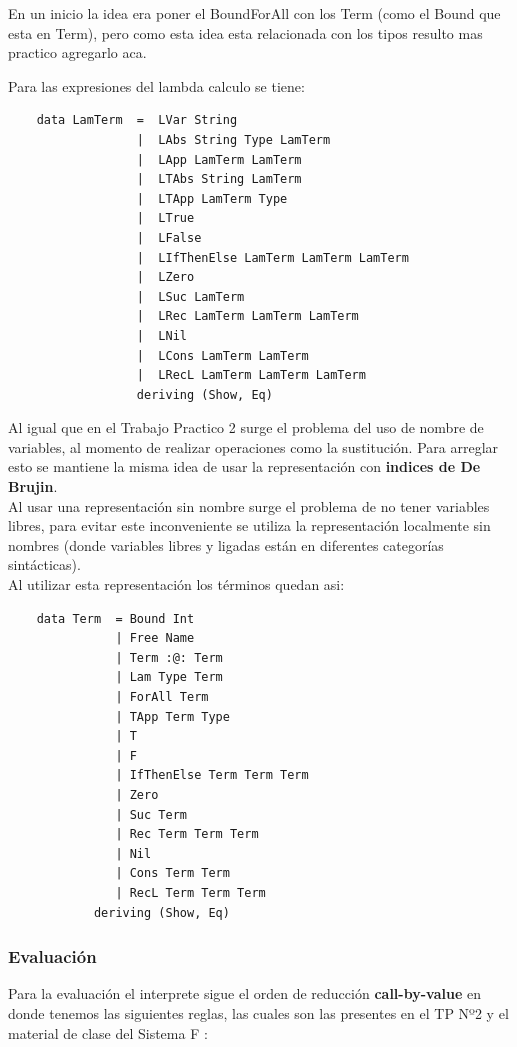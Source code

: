 \documentclass[12pt, titlepage, a4paper]{article}
\begin{document}
En un inicio la idea era poner el BoundForAll con los Term (como el Bound que esta en Term), pero como esta idea esta relacionada con 
los tipos resulto mas practico agregarlo aca.

\noindent Para las expresiones del lambda calculo se tiene:
\begin{verbatim}
    data LamTerm  =  LVar String
                  |  LAbs String Type LamTerm
                  |  LApp LamTerm LamTerm
                  |  LTAbs String LamTerm
                  |  LTApp LamTerm Type
                  |  LTrue 
                  |  LFalse
                  |  LIfThenElse LamTerm LamTerm LamTerm
                  |  LZero
                  |  LSuc LamTerm
                  |  LRec LamTerm LamTerm LamTerm
                  |  LNil
                  |  LCons LamTerm LamTerm
                  |  LRecL LamTerm LamTerm LamTerm
                  deriving (Show, Eq)
\end{verbatim}

Al igual que en el Trabajo Practico 2 \cite{tp2:lambdaCalculoSimpleTipado} surge el problema del uso de nombre de variables, al 
momento de realizar operaciones como la sustitución. Para arreglar esto se mantiene la misma idea de 
usar la representación con \textbf{indices de De Brujin}. \\

Al usar una representación sin nombre surge el problema de no tener variables libres,  
para evitar este inconveniente se utiliza la representación localmente sin nombres (donde variables libres y ligadas están 
en diferentes categorías sintácticas). \\

\noindent Al utilizar esta representación los términos quedan asi:
\begin{verbatim}
    data Term  = Bound Int
               | Free Name 
               | Term :@: Term
               | Lam Type Term
               | ForAll Term
               | TApp Term Type
               | T
               | F
               | IfThenElse Term Term Term
               | Zero
               | Suc Term
               | Rec Term Term Term
               | Nil
               | Cons Term Term
               | RecL Term Term Term
            deriving (Show, Eq)
\end{verbatim}

\subsubsection{Evaluación}
Para la evaluación el interprete sigue el orden de reducción \textbf{call-by-value} en donde tenemos las siguientes reglas, las cuales 
son las presentes en el TP Nº2 \cite{tp2:lambdaCalculoSimpleTipado} y el material de clase del Sistema F \cite{ALP:Polimorfismo}:
\end{document}
